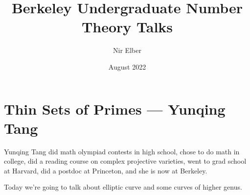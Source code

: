 \documentclass{article}
\title{Berkeley Undergraduate Number Theory Talks}
\author{Nir Elber}
\date{August 2022}
\begin{document}
\maketitle

\tableofcontents

\section{Thin Sets of Primes --- Yunqing Tang}
Yunqing Tang did math olympiad contests in high school, chose to do math in college, did a reading course on complex projective varieties, went to grad school at Harvard, did a postdoc at Princeton, and she is now at Berkeley.

Today we're going to talk about elliptic curve and some curves of higher genus.
\end{document}
